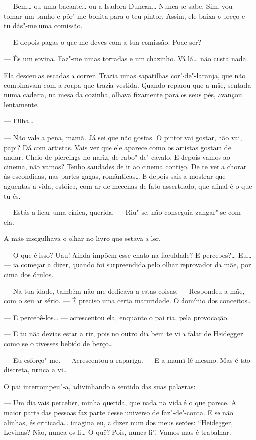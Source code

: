 --- Bem\ldots{} ou uma bacante\ldots{} ou a Isadora Duncan\ldots{} Nunca se sabe. Sim,
vou tomar um banho e pôr"-me bonita para o teu pintor. Assim, ele baixa o
preço e tu dás"-me uma comissão.

--- E depois pagas o que me deves com a tua comissão. Pode ser?

--- És um sovina. Faz"-me umas torradas e um chazinho. Vá lá\ldots{} não custa
nada.

Ela desceu as escadas a correr. Trazia umas sapatilhas cor"-de"-laranja,
que não combinavam com a roupa que trazia vestida. Quando reparou que a
mãe, sentada numa cadeira, na mesa da cozinha, olhava fixamente para os
seus pés, avançou lentamente.

--- Filha\ldots{}

--- Não vale a pena, mamã. Já sei que não gostas. O pintor vai gostar, não
vai, papi? Dá com artistas. Vais ver que ele aparece como os artistas
gostam de andar. Cheio de piercings no nariz, de rabo"-de"-cavalo. E
depois vamos ao cinema, não vamos? Tenho saudades de ir ao cinema
contigo. De te ver a chorar às escondidas, nas partes gagas,
românticas\ldots{} E depois sais a mostrar que aguentas a vida, estóico, com
ar de mecenas de fato assertoado, que afinal é o que tu és.

--- Estás a ficar uma cínica, querida. ---  Riu"-se, não conseguia zangar"-se
com ela.

A mãe mergulhava o olhar no livro que estava a ler.

--- O que é isso? Uau! Ainda impõem esse chato na faculdade? E
percebes?\ldots{} Eu\ldots{} --- ia começar a dizer, quando foi surpreendida pelo
olhar reprovador da mãe, por cima dos óculos.

--- Na tua idade, também não me dedicava a estas coisas. --- Respondeu a
mãe, com o seu ar sério. --- É preciso uma certa maturidade. O domínio dos
conceitos\ldots{}

--- E percebê-los\ldots{} --- acrescentou ela, enquanto o pai ria, pela
provocação.

--- E tu não devias estar a rir, pois no outro dia bem te vi a falar de
Heidegger como se o tivesses bebido de berço\ldots{}

--- Eu esforço"-me. --- Acrescentou a rapariga. --- E a mamã lê mesmo. Mas é
tão discreta, nunca a vi\ldots{}

O pai interrompeu"-a, adivinhando o sentido das suas palavras:

--- Um dia vais perceber, minha querida, que nada na vida é o que parece.
A maior parte das pessoas faz parte desse universo de faz"-de"-conta. E se
não alinhas, és criticada\ldots{} imagina eu, a dizer num dos meus serões:
``Heidegger, Levinas? Não, nunca os li\ldots{} O quê? Pois, nunca li''. Vamos
mas é trabalhar.

